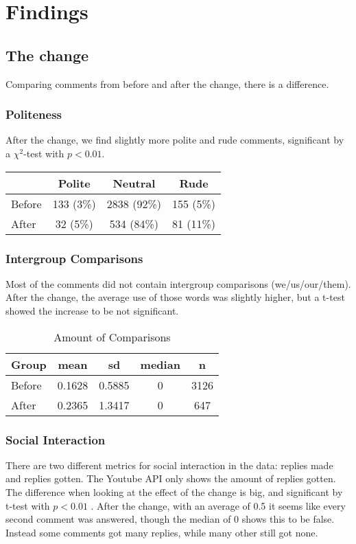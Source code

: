 \documentclass{chi-ext2}
\begin{document}
\section{Findings}
\subsection{The change}\label{sc:change}
Comparing comments from before and after the change, there is a  difference.
\subsubsection{Politeness}
 After the change, we find slightly more polite and rude comments, significant by a \(\chi^2\)-test with \(p < 0.01\).

\begin{center}
\begin{tabular}{| l | c | c | c | }
    \hline
     & Polite & Neutral & Rude \\
    \hline
    Before & 133 (3\%) & 2838 (92\%)& 155 (5\%) \\
    After & 32 (5\%) & 534 (84\%) & 81 (11\%)\\
 \hline
\end{tabular}
\end{center}

\subsubsection{Intergroup Comparisons}
Most of the comments did not contain intergroup comparisons (we/us/our/them). After the change, the average use of those words was slightly higher, but a t-test showed the increase to be not significant.

\begin{table}
\caption{Amount of Comparisons}
\centering
\begin{tabular}{| l | c | c | c | c |}
\hline
\hline
Group & mean & sd & median & n \\
\hline
Before & 0.1628 & 0.5885 & 0 & 3126 \\
After & 0.2365 & 1.3417 & 0 & 647 \\
\hline
\end{tabular}
\label{table:comparisonsChange}
\end{table}

\subsubsection{Social Interaction}
There are two different metrics for social interaction in the data: replies made and replies gotten. The Youtube API only shows the amount of replies gotten. The difference when looking at the effect of the change is big, and significant by t-test with \(p < 0.01\) . After the change, with an average of 0.5 it seems like every second comment was answered, though the median of 0 shows this to be false. Instead some comments got many replies, while many other still got none.
\end{document}

